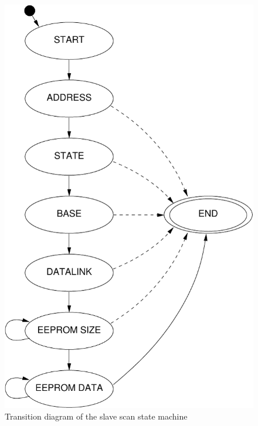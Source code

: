 \documentclass[a4paper,12pt,BCOR6mm,bibtotoc,idxtotoc]{scrbook}
\begin{document}
\begin{figure}[htbp]
  \centering
  \includegraphics[width=.6\textwidth]{images/fsm-slavescan}
  \caption{Transition diagram of the slave scan state machine}
  \label{fig:fsm-slavescan}
\end{figure}
\end{document}
